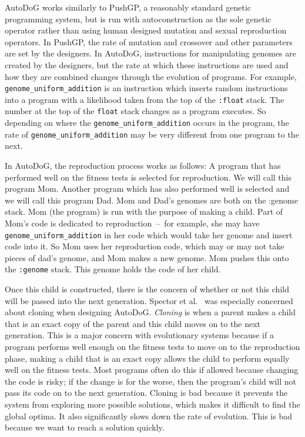 \documentclass{sig-alternate}
\begin{document}
AutoDoG works similarly to PushGP, a reasonably standard genetic programming system, but is run with autoconstruction as the sole genetic operator rather than using human designed mutation and sexual reproduction operators. In PushGP, the rate of mutation and crossover and other parameters are set by the designers. In AutoDoG, instructions for manipulating genomes are created by the designers, but the rate at which these instructions are used and how they are combined changes through the evolution of programs. For example, \texttt{genome\_uniform\_addition} is an instruction which inserts random instructions into a program with a likelihood taken from the top of the \texttt{:float} stack. The number at the top of the \texttt{float} stack changes as a program executes. So depending on where the \texttt{genome\_uniform\_addition} occurs in the program, the rate of \texttt{genome\_uniform\_addition} may be very different from one program to the next.

In AutoDoG, the reproduction process works as follows:
A program that has performed well on the fitness tests is selected for reproduction. We will call this program Mom. Another program which has also performed well is selected and we will call this program Dad. Mom and Dad's genomes are both on the :genome stack. Mom (the program) is run with the purpose of making a child. Part of Mom's code is dedicated to reproduction~--~for example, she may have \texttt{genome\_uniform\_addition} in her code which would take her genome and insert code into it. So Mom uses her reproduction code, which may or may not take pieces of dad's genome, and Mom makes a new genome. Mom pushes this onto the \texttt{:genome} stack. This genome holds the code of her child. 

Once this child is constructed, there is the concern of whether or not this child will be passed into the next generation. Spector et al.~\cite{spector:2016} was especially concerned about cloning when designing AutoDoG. \textit{Cloning} is when a parent makes a child that is an exact copy of the parent and this child moves on to the next generation. This is a major concern with evolutionary systems because if a program performs well enough on the fitness tests to move on to the reproduction phase, making a child that is an exact copy allows the child to perform equally well on the fitness tests. Most programs often do this if allowed because changing the code is risky; if the change is for the worse, then the program's child will not pass its code on to the next generation. Cloning is bad because it prevents the system from exploring more possible solutions, which makes it difficult to find the global optima. It also significantly slows down the rate of evolution. This is bad because we want to reach a solution quickly.
\end{document}

